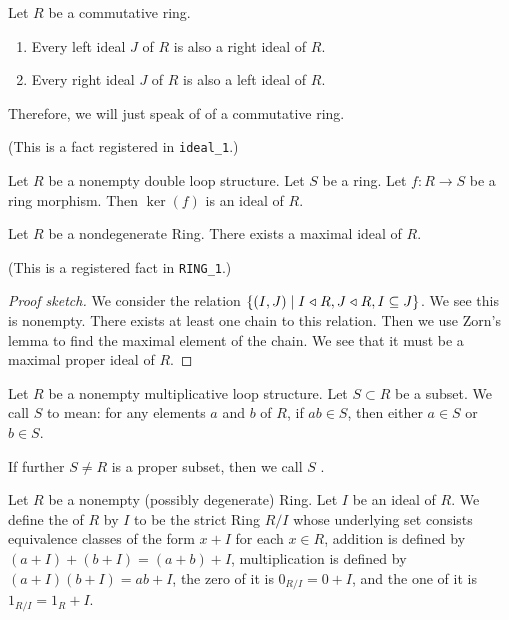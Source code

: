 \begin{theorem}
Let $R$ be a commutative ring.
\begin{enumerate}
\item Every left ideal $J$ of $R$ is also a right ideal of $R$.
\item Every right ideal $J$ of $R$ is also a left ideal of $R$.
\end{enumerate}
Therefore, we will just speak of  of a commutative ring.
\end{theorem}
(This is a fact registered in \texttt{ideal\_1}.)

\begin{theorem}
Let $R$ be a nonempty double loop structure.
Let $S$ be a ring. Let $f\colon R\to S$ be a ring morphism.
Then $\ker(f)$ is an ideal of $R$.
\end{theorem}

\begin{theorem}
Let $R$ be a nondegenerate Ring.
There exists a maximal ideal of $R$.
\end{theorem}

(This is a registered fact in \texttt{RING\_1}.)

\begin{proof}[Proof sketch]
We consider the relation $\{(I,J)\mid I\mathrel{\triangleleft} R, J\mathrel{\triangleleft} R, I\subseteq J\}$.
We see this is nonempty.
There exists at least one chain to this relation.
Then we use Zorn's lemma to find the maximal element of the chain.
We see that it must be a maximal proper ideal of $R$.
\end{proof}

\begin{definition}
Let $R$ be a nonempty multiplicative loop structure.
Let $S\subset R$ be a subset.
We call $S$  to mean: for any elements $a$ and $b$
of $R$, if $ab\in S$, then either $a\in S$ or $b\in S$.

If further $S\neq R$ is a proper subset, then we call $S$ .
\end{definition}

\begin{definition}
Let $R$ be a nonempty (possibly degenerate) Ring.
Let $I$ be an ideal of $R$.
We define the  of $R$ by $I$ to be the strict
Ring $R/I$ whose underlying set consists equivalence classes of the form
$x + I$ for each $x\in R$, addition is defined by $(a+I)+(b+I)=(a+b)+I$,
multiplication is defined by $(a+I)(b+I)=ab+I$, the zero of it is $0_{R/I}=0+I$,
and the one of it is $1_{R/I}=1_{R}+I$.
\end{definition}

